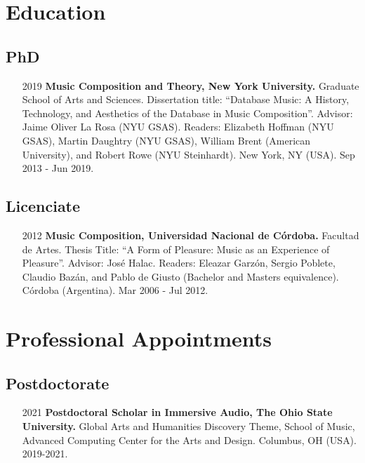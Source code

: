 \documentclass[12pt,overlapped]{res}%
\begin{document}
%
\pagestyle{empty}%
\normalsize%
\raggedright%
\begin{resume}
\section{Education}%
\label{sec:Education}%
\subsection{PhD}%
\fullline%
\begin{itemize}[align=parleft,leftmargin=2.25cm,labelwidth=2cm]
\item[2019]
\textbf{Music Composition and Theory, New York University.}
Graduate School of Arts and Sciences. 
Dissertation title: ``Database Music: A History, Technology, and Aesthetics of the Database in Music Composition''. Advisor: Jaime Oliver La Rosa (NYU GSAS). Readers: Elizabeth Hoffman (NYU GSAS), Martin Daughtry (NYU GSAS), William Brent (American University), and Robert Rowe (NYU Steinhardt). 
New York, NY (USA). 
Sep  2013 {-} Jun  2019.
\end{itemize}%
\subsection{Licenciate}%
\fullline%
\begin{itemize}[align=parleft,leftmargin=2.25cm,labelwidth=2cm]
\item[2012]
\textbf{Music Composition, Universidad Nacional de Córdoba.}
Facultad de Artes. 
Thesis Title: ``A Form of Pleasure: Music as an Experience of Pleasure''. Advisor: José Halac. Readers: Eleazar Garzón, Sergio Poblete, Claudio Bazán, and Pablo de Giusto (Bachelor and Masters equivalence). 
Córdoba (Argentina). 
Mar  2006 {-} Jul  2012.
\end{itemize}


\section{Professional Appointments}%
\label{sec:ProfessionalAppointments}%
\subsection{Postdoctorate}%
\fullline%
\begin{itemize}[align=parleft,leftmargin=2.25cm,labelwidth=2cm]
\item[2021]
\textbf{Postdoctoral Scholar in Immersive Audio, The Ohio State University.}
Global Arts and Humanities Discovery Theme, School of Music, Advanced Computing Center for the Arts and Design. 
Columbus, OH (USA). 
2019{-}2021.
\end{itemize}%

\end{resume}
\end{document}
